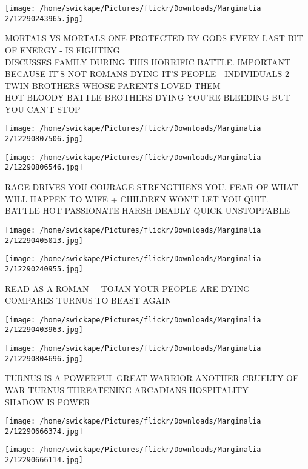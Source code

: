 \documentclass[10pt,letterpaper]{article}
\begin{document}
\texttt{[image: /home/swickape/Pictures/flickr/Downloads/Marginalia 2/12290243965.jpg]}

MORTALS VS MORTALS ONE PROTECTED BY GODS EVERY LAST BIT OF ENERGY {-} IS FIGHTING\\
DISCUSSES FAMILY DURING THIS HORRIFIC BATTLE.  IMPORTANT BECAUSE IT'S NOT ROMANS DYING IT'S PEOPLE {-} INDIVIDUALS 2 TWIN BROTHERS WHOSE PARENTS LOVED THEM\\
HOT BLOODY BATTLE BROTHERS DYING YOU'RE BLEEDING BUT YOU CAN'T STOP
\pagebreak

\texttt{[image: /home/swickape/Pictures/flickr/Downloads/Marginalia 2/12290807506.jpg]}

\vspace{0.25in}
\texttt{[image: /home/swickape/Pictures/flickr/Downloads/Marginalia 2/12290806546.jpg]}

RAGE DRIVES YOU COURAGE STRENGTHENS YOU. FEAR OF WHAT WILL HAPPEN TO WIFE + CHILDREN WON'T LET YOU QUIT.\\
BATTLE HOT PASSIONATE HARSH DEADLY QUICK UNSTOPPABLE
\pagebreak

\texttt{[image: /home/swickape/Pictures/flickr/Downloads/Marginalia 2/12290405013.jpg]}

\vspace{0.25in}
\texttt{[image: /home/swickape/Pictures/flickr/Downloads/Marginalia 2/12290240955.jpg]}

READ AS A ROMAN + TOJAN YOUR PEOPLE ARE DYING\\
COMPARES TURNUS TO BEAST AGAIN
\pagebreak

\texttt{[image: /home/swickape/Pictures/flickr/Downloads/Marginalia 2/12290403963.jpg]}

\vspace{0.25in}
\texttt{[image: /home/swickape/Pictures/flickr/Downloads/Marginalia 2/12290804696.jpg]}

TURNUS IS A POWERFUL GREAT WARRIOR ANOTHER CRUELTY OF WAR TURNUS THREATENING ARCADIANS HOSPITALITY\\
SHADOW IS POWER
\pagebreak

\texttt{[image: /home/swickape/Pictures/flickr/Downloads/Marginalia 2/12290666374.jpg]}

\vspace{0.25in}
\texttt{[image: /home/swickape/Pictures/flickr/Downloads/Marginalia 2/12290666114.jpg]}
\end{document}
